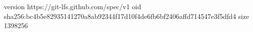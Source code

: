 version https://git-lfs.github.com/spec/v1
oid sha256:bc4b5e82935141270a8ab92344f17d10f4de6fb6bf2406affd714547e3f5dfd4
size 1398256
